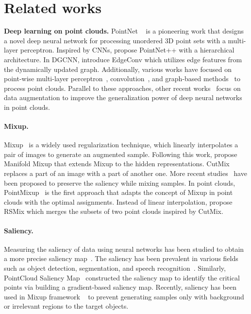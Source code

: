 \documentclass{article}
\begin{document}
 \section{Related works}
\label{sec:rel}
\textbf{Deep learning on point clouds.}
PointNet ~\cite{qi2017pointnet} is a pioneering work that designs a novel deep neural network for processing unordered 3D point sets with a multi-layer perceptron. Inspired by CNNs, \citet{qi2017pointnet++} propose PointNet++ with a hierarchical architecture. In DGCNN, \citet{wang2019dynamic} introduce EdgeConv which utilizes edge features from the dynamically updated graph.
Additionally, various works have focused on point-wise multi-layer perceptron~\cite{joseph2019momen, yan2020pointasnl, zhao2019pointweb}, convolution~\cite{hua2018pointwise,   lan2019modeling,lei2019octree,li2018pointcnn,liu2019relation, thomas2019kpconv, wu2019pointconv}, and graph-based methods~\cite{shen2018mining, zhang2018graph} to process point clouds. Parallel to these approaches, other recent works~\cite{chen2020pointmixup, kim2021point, lee2021regularization,li2020pointaugment, yun2019cutmix} focus on data augmentation to improve the generalization power of deep neural networks in point clouds.

\paragraph{Mixup.}
Mixup~\cite{DBLP:conf/iclr/ZhangCDL18} is a widely used regularization technique, which linearly interpolates a pair of images to generate an augmented sample. 
Following this work, \citet{verma2019manifold} propose Manifold Mixup that extends Mixup to the hidden representations. CutMix ~\cite{yun2019cutmix} replaces a part of an image with a part of another one. 
More recent studies~\cite{kim2020puzzle, DBLP:conf/iclr/KimCJS21, DBLP:conf/iclr/UddinMSCB21} have been proposed to preserve the saliency while mixing samples. 
In point clouds, PointMixup~\cite{chen2020pointmixup} is the first approach that adapts the concept of Mixup in point clouds with the optimal assignments. Instead of linear interpolation, \citet{lee2021regularization} propose RSMix which merges the subsets of two point clouds inspired by CutMix.

\paragraph{Saliency.}
Measuring the saliency of data using neural networks has been studied to obtain a more precise saliency map~\cite{selvaraju2017grad, wang2015deep, zhao2015saliency}. The saliency has been prevalent in various fields such as object detection, segmentation, and speech recognition~\cite{gong2021keepaugment, jung2011unified, kalinli2007saliency, ren2013region, wei2017object}. Similarly, PointCloud Saliency Map~\cite{zheng2019pointcloud} constructed the saliency map to identify the critical points via building a gradient-based saliency map. Recently, saliency has been used in Mixup framework ~\cite{kim2020puzzle, DBLP:conf/iclr/KimCJS21, DBLP:conf/iclr/UddinMSCB21} to prevent generating samples only with background or irrelevant regions to the target objects.
\end{document}
